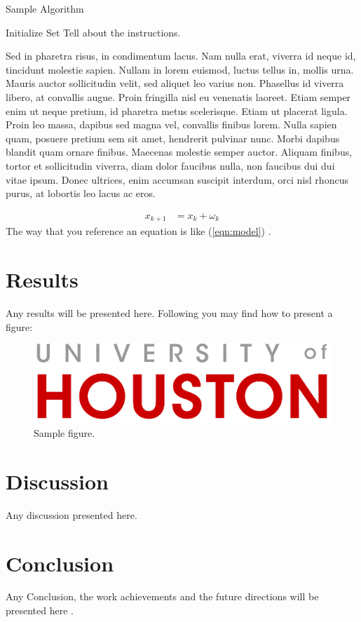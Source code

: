 \documentclass[10pt,conference]{ieeeconf}
\begin{document}
\begin{algorithm}[H]
  \caption{Sample Algorithm}\label{euclid}
  \begin{algorithmic}[1]
   \State Initialize
   \State Set 
  \EndFor
\State Tell about the instructions.  
\end{algorithmic}
\end{algorithm} 

Sed in pharetra risus, in condimentum lacus. Nam nulla erat, viverra id neque id, tincidunt molestie sapien. Nullam in lorem euismod, luctus tellus in, mollis urna. Mauris auctor sollicitudin velit, sed aliquet leo varius non. Phasellus id viverra libero, at convallis augue. Proin fringilla nisl eu venenatis laoreet. Etiam semper enim ut neque pretium, id pharetra metus scelerisque. Etiam ut placerat ligula. Proin leo massa, dapibus sed magna vel, convallis finibus lorem. Nulla sapien quam, posuere pretium sem sit amet, hendrerit pulvinar nunc. Morbi dapibus blandit quam ornare finibus. Maecenas molestie semper auctor. Aliquam finibus, tortor et sollicitudin viverra, diam dolor faucibus nulla, non faucibus dui dui vitae ipsum. Donec ultrices, enim accumsan suscipit interdum, orci nisl rhoncus purus, at lobortis leo lacus ac eros.

\begin{align}\label{eqn:model}
    x_{k+1} &= x_k +\omega_k
\end{align}
The way that you reference an equation is like (\ref{eqn:model}) .

\section{Results}

Any results will be presented here.
Following you may find how to present a figure:

\begin{figure}[h]
\centering
  \includegraphics[scale=1]{uh-primary.png}
  \caption{Sample figure.}
  \label{fig:uh}
\end{figure}

\section{Discussion}
Any discussion presented here.

\section{Conclusion}
Any Conclusion, the work achievements and the future directions will be presented here \cite{wickramasuriya2019skin}.



\end{document}
